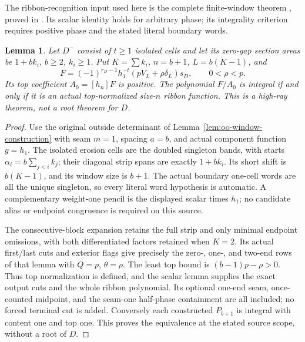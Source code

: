 \documentclass[11pt,a4paper]{amsart}
\numberwithin{equation}{section}
\theoremstyle{plain}
\newtheorem{lemma}[theorem]{Lemma}
\theoremstyle{definition}
\begin{document}
The ribbon-recognition input used here is the complete finite-window theorem , proved in .  Its scalar identity holds for arbitrary phase; its integrality criterion requires positive phase and the stated literal boundary words.

\begin{lemma}\label{lem:two-window-recognition}
Let \(D^-\) consist of \(t\ge1\) isolated cells and let its zero-gap section areas be \(1+bk_i\), \(b\ge2\), \(k_i\ge1\).  Put \(K=\sum k_i\), \(n=b+1\), \(L=b(K-1)\), and
\[
 F=(-1)^{r_D-1}h_1^{-t}(pV_L+\rho\delta_L)s_D,\qquad0<\rho<p.
\]
Its top coefficient \(A_0=[h_n]F\) is positive.  The polynomial \(F/A_0\) is integral if and only if it is an actual top-normalized size-\(n\) ribbon function.  This is a high-ray theorem, not a root theorem for \(D\).
\end{lemma}
\begin{proof}
Use the original outside determinant of Lemma~\ref{lem:oo-window-construction}
with seam \(m=1\), spacing \(a=b\), and actual component function \(g=h_1\).
The isolated erosion cells are the doubled singleton bands, with starts
\(\alpha_i=b\sum_{j<i}k_j\); their diagonal strip spans are exactly
\(1+bk_i\).  Its short shift is \(b(K-1)\), and its window size is
\(b+1\).  The actual boundary one-cell words are all the unique singleton,
so every literal word hypothesis is automatic.  A complementary weight-one
pencil is the displayed scalar times \(h_1\); no candidate alias or endpoint
congruence is required on this source.

The consecutive-block expansion retains the full strip and only minimal
endpoint omissions, with both differentiated factors retained when \(K=2\).
Its actual first/last cuts and exterior flags give precisely the zero-, one-,
and two-end rows of that lemma with \(Q=p\), \(\theta=\rho\).
The least top bound is \((b-1)p-\rho>0\).  Thus top normalization is defined,
and the scalar lemma supplies the exact output cuts and the whole ribbon
polynomial.  Its optional one-end seam, once-counted midpoint, and the
seam-one half-phase containment are all included; no forced terminal cut
is added.  Conversely each constructed \(P_{b+1}\) is integral with content
one and top one.  This proves the equivalence at the stated source scope,
without a root of \(D\).
\end{proof}
\end{document}
